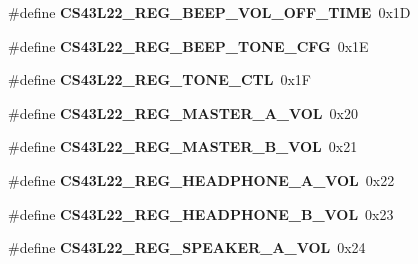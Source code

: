 \begin{DoxyCompactItemize}
\mbox{\label{group___c_s43_l22___exported___constants_gace4f8f20dc82bf4f682a55d22ac2d0cd}} 
\#define {\bfseries C\+S43\+L22\+\_\+\+R\+E\+G\+\_\+\+B\+E\+E\+P\+\_\+\+V\+O\+L\+\_\+\+O\+F\+F\+\_\+\+T\+I\+ME}~0x1D
\item 
\mbox{\label{group___c_s43_l22___exported___constants_ga9af87db1be055d31ddbc72a695704d9a}} 
\#define {\bfseries C\+S43\+L22\+\_\+\+R\+E\+G\+\_\+\+B\+E\+E\+P\+\_\+\+T\+O\+N\+E\+\_\+\+C\+FG}~0x1E
\item 
\mbox{\label{group___c_s43_l22___exported___constants_gad997841720bb6327a2b600e8a57aecf9}} 
\#define {\bfseries C\+S43\+L22\+\_\+\+R\+E\+G\+\_\+\+T\+O\+N\+E\+\_\+\+C\+TL}~0x1F
\item 
\mbox{\label{group___c_s43_l22___exported___constants_ga464f58c67fbeba1230b1a0ac11e2e8d7}} 
\#define {\bfseries C\+S43\+L22\+\_\+\+R\+E\+G\+\_\+\+M\+A\+S\+T\+E\+R\+\_\+\+A\+\_\+\+V\+OL}~0x20
\item 
\mbox{\label{group___c_s43_l22___exported___constants_ga80e8adac2dab40d6cabe538154f07c6c}} 
\#define {\bfseries C\+S43\+L22\+\_\+\+R\+E\+G\+\_\+\+M\+A\+S\+T\+E\+R\+\_\+\+B\+\_\+\+V\+OL}~0x21
\item 
\mbox{\label{group___c_s43_l22___exported___constants_gade1724e4e0409bbd291278010aa82a5b}} 
\#define {\bfseries C\+S43\+L22\+\_\+\+R\+E\+G\+\_\+\+H\+E\+A\+D\+P\+H\+O\+N\+E\+\_\+\+A\+\_\+\+V\+OL}~0x22
\item 
\mbox{\label{group___c_s43_l22___exported___constants_ga69f431d62eee642194fd97785eb7559a}} 
\#define {\bfseries C\+S43\+L22\+\_\+\+R\+E\+G\+\_\+\+H\+E\+A\+D\+P\+H\+O\+N\+E\+\_\+\+B\+\_\+\+V\+OL}~0x23
\item 
\mbox{\label{group___c_s43_l22___exported___constants_gaaf3d089322621f0e29d299aac00d033e}} 
\#define {\bfseries C\+S43\+L22\+\_\+\+R\+E\+G\+\_\+\+S\+P\+E\+A\+K\+E\+R\+\_\+\+A\+\_\+\+V\+OL}~0x24
\item 

\end{DoxyCompactItemize}

